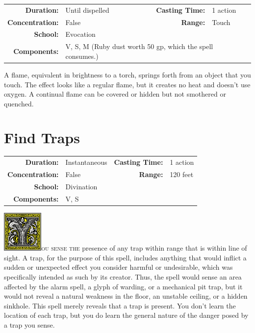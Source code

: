 \documentclass[12pt,showtrims]{memoir}
\begin{document}
{
\small\centering\vspace{-6pt}
\begin{tabular}{rlrl}
\toprule

\textbf{Duration:} & Until dispelled &
\textbf{Casting Time:} & 1 action \\
\textbf{Concentration:} & False &
\textbf{Range:} & Touch \\
\textbf{School:} & Evocation \\
\textbf{Components:} & \multicolumn{3}{p{0.7\textwidth}}{V, S, M (Ruby dust worth 50 gp, which the spell consumes.)}\\

\bottomrule
\end{tabular}
}

\vspace{1\baselineskip}\noindent A flame, equivalent in brightness to a torch, springs forth from an object that you touch. The effect looks like a regular flame, but it creates no heat and doesn't use oxygen. A continual flame can be covered or hidden but not smothered or quenched.

\newpage
\section*{Find Traps}

{
\small\centering\vspace{-6pt}
\begin{tabular}{rlrl}
\toprule

\textbf{Duration:} & Instantaneous &
\textbf{Casting Time:} & 1 action \\
\textbf{Concentration:} & False &
\textbf{Range:} & 120 feet \\
\textbf{School:} & Divination \\
\textbf{Components:} & \multicolumn{3}{p{0.7\textwidth}}{V, S}\\

\bottomrule
\end{tabular}
}

\vspace{1\baselineskip}\noindent
\lettrine[lines=4]{\includegraphics[height=58pt]{initials/Y.png}}{ou sense the} presence of any trap within range that is within line of sight. A trap, for the purpose of this spell, includes anything that would inflict a sudden or unexpected effect you consider harmful or undesirable, which was specifically intended as such by its creator. Thus, the spell would sense an area affected by the alarm spell, a glyph of warding, or a mechanical pit trap, but it would not reveal a natural weakness in the floor, an unstable ceiling, or a hidden sinkhole. This spell merely reveals that a trap is present. You don't learn the location of each trap, but you do learn the general nature of the danger posed by a trap you sense.
\end{document}
